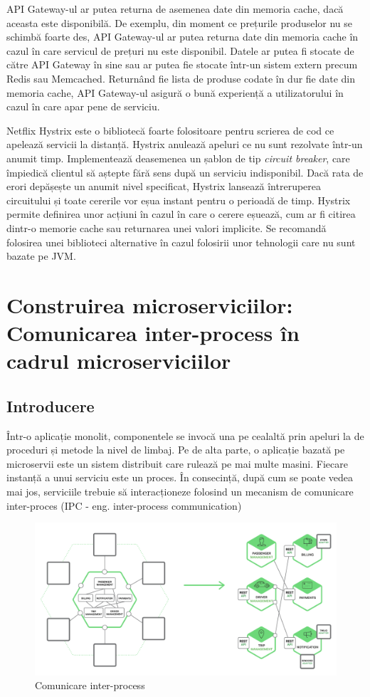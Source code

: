 \documentclass[12pt, a4paper, oneside, romanian]{teza-upb}
\begin{document}
API Gateway-ul ar putea returna de asemenea date din memoria cache, dacă aceasta este disponibilă. De exemplu, din moment ce prețurile produselor nu se schimbă foarte des, API Gateway-ul ar putea returna date din memoria cache în cazul în care servicul de prețuri nu este disponibil. Datele ar putea fi stocate de către API Gateway în sine sau ar putea fie stocate într-un sistem extern precum Redis sau Memcached. Returnând fie lista de produse codate în dur fie date din memoria cache, API Gateway-ul asigură o bună experiență a utilizatorului în cazul în care apar pene de serviciu. 

Netflix Hystrix este o bibliotecă foarte folositoare pentru scrierea de cod ce apelează servicii la distanță. Hystrix anulează apeluri ce nu sunt rezolvate într-un anumit timp. Implementează deasemenea un șablon de tip \textit{circuit breaker}, care împiedică clientul să aștepte fără sens după un serviciu indisponibil. Dacă rata de erori depășește un anumit nivel specificat, Hystrix lansează întreruperea circuitului și toate cererile vor eșua instant pentru o perioadă de timp.  Hystrix permite definirea unor acțiuni în cazul în care o cerere eșuează, cum ar fi citirea dintr-o memorie cache sau returnarea unei valori implicite. Se recomandă folosirea unei biblioteci alternative în cazul folosirii unor tehnologii care nu sunt bazate pe JVM. 

\newpage
\section{Construirea microserviciilor: Comunicarea inter-process în cadrul microserviciilor}

\subsection{Introducere}

Într-o aplicație monolit, componentele se invocă una pe cealaltă prin apeluri la de proceduri și metode la nivel de limbaj. Pe de alta parte, o aplicație bazată pe microservii este un sistem distribuit care rulează pe mai multe masini. Fiecare instanță a unui serviciu este un proces. În consecință, după cum se poate vedea mai jos, serviciile trebuie să interacționeze folosind un mecanism de comunicare inter-proces (IPC - eng. inter-process communication)

\begin{figure}[ht]
\centering
\includegraphics[scale=0.45]{img/ipc-1.png}
\caption{Comunicare inter-process}
\label{fig:arhi_componente}
\end{figure}
\end{document}
